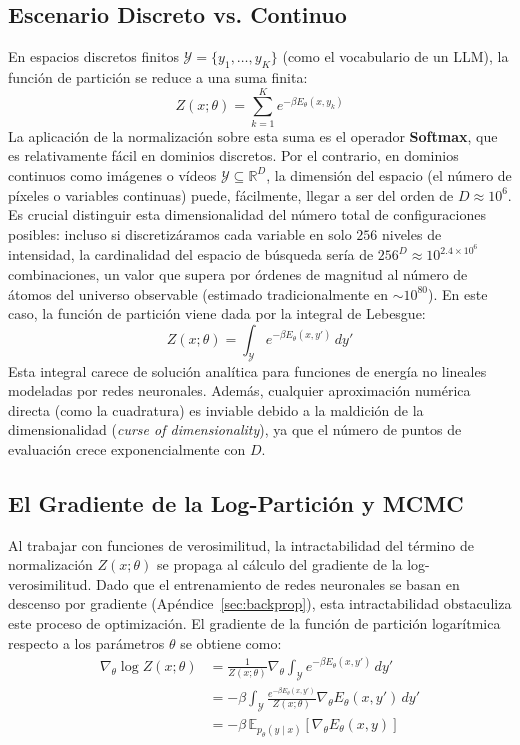 \subsection{Escenario Discreto vs. Continuo}
En espacios discretos finitos $\mathcal{Y} = \{y_1, \dots, y_K\}$ (como el vocabulario de un LLM), la función de partición se reduce a una suma finita:
\begin{equation}
Z(x; \theta) = \sum_{k=1}^K e^{-\beta E_\theta(x, y_k)}
\end{equation}
La aplicación de la normalización sobre esta suma es el operador \textbf{Softmax}, que es relativamente fácil en dominios discretos. Por el contrario, en dominios continuos como imágenes o vídeos $\mathcal{Y} \subseteq \mathbb{R}^D$, la dimensión del espacio (el número de píxeles o variables continuas) puede, fácilmente, llegar a ser del orden de $D \approx 10^6$. Es crucial distinguir esta dimensionalidad del número total de configuraciones posibles: incluso si discretizáramos cada variable en solo $256$ niveles de intensidad, la cardinalidad del espacio de búsqueda sería de $256^D \approx 10^{2.4 \times 10^6}$ combinaciones, un valor que supera por órdenes de magnitud al número de átomos del universo observable (estimado tradicionalmente en $\sim 10^{80}$). En este caso, la función de partición viene dada por la integral de Lebesgue:
\begin{equation}
Z(x; \theta) = \int_{\mathcal{Y}} e^{-\beta E_\theta(x, y')} \, dy'
\end{equation}
Esta integral carece de solución analítica para funciones de energía no lineales modeladas por redes neuronales. Además, cualquier aproximación numérica directa (como la cuadratura) es inviable debido a la maldición de la dimensionalidad (\textit{curse of dimensionality}), ya que el número de puntos de evaluación crece exponencialmente con $D$.

\subsection{El Gradiente de la Log-Partición y MCMC}
Al trabajar con funciones de verosimilitud, la intractabilidad del término de normalización $Z(x; \theta)$ se propaga al cálculo del gradiente de la log-verosimilitud. Dado que el entrenamiento de redes neuronales se basan en descenso por gradiente (Apéndice~\ref{sec:backprop}), esta intractabilidad obstaculiza este proceso de optimización. El gradiente de la función de partición logarítmica respecto a los parámetros $\theta$ se obtiene como:
\begin{align}
\nabla_\theta \log Z(x; \theta) &= \frac{1}{Z(x; \theta)} \nabla_\theta \int_{\mathcal{Y}} e^{-\beta E_\theta(x, y')} \, dy' \nonumber \\
&= -\beta \int_{\mathcal{Y}} \frac{e^{-\beta E_\theta(x, y')}}{Z(x; \theta)} \nabla_\theta E_\theta(x, y') \, dy' \nonumber \\
&= -\beta \, \mathbb{E}_{p_\theta(y \mid x)} \left[ \nabla_\theta E_\theta(x, y) \right]
\end{align}

